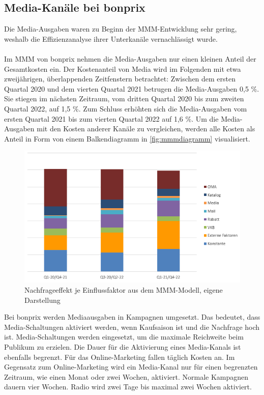 \subsection{Media-Kanäle bei bonprix} 
\label{MediaKanäleBeiBonprix}
Die Media-Ausgaben waren zu Beginn der \ac{MMM}-Entwicklung sehr gering, weshalb die Effizienzanalyse ihrer Unterkanäle vernachlässigt wurde. \\\\
Im \ac{MMM} von bonprix nehmen die Media-Ausgaben nur einen kleinen Anteil der Gesamtkosten ein. Der Kostenanteil von Media wird im Folgenden mit etwa zweijährigen, überlappenden Zeitfenstern betrachtet: Zwischen dem ersten Quartal 2020 und dem vierten Quartal 2021 betrugen die Media-Ausgaben 0,5 \%. Sie stiegen im nächsten Zeitraum, vom dritten Quartal 2020 bis zum zweiten Quartal 2022, auf 1,5 \%. Zum Schluss erhöhten sich die Media-Ausgaben vom ersten Quartal 2021 bis zum vierten Quartal 2022 auf 1,6 \%. Um die Media-Ausgaben mit den Kosten anderer Kanäle zu vergleichen, werden alle Kosten als Anteil in Form von einem Balkendiagramm in \autoref{fig:mmmdiagramm} visualisiert. 
\begin{figure}[H]
    \centering
    \includegraphics[width=0.75\linewidth]{images/mmmdiagramm.png}
    \caption{Nachfrageeffekt je Einflussfaktor aus dem \ac{MMM}-Modell, eigene Darstellung }
    \label{fig:mmmdiagramm}
\end{figure}
\noindent
Bei bonprix werden Mediaausgaben in Kampagnen umgesetzt. Das bedeutet, dass Media-Schaltungen aktiviert werden, wenn Kaufsaison ist und die Nachfrage hoch ist. Media-Schaltungen werden eingesetzt, um die maximale Reichweite beim Publikum zu erzielen. Die Dauer für die Aktivierung eines Media-Kanals ist ebenfalls begrenzt. Für das Online-Marketing fallen täglich Kosten an. Im Gegensatz zum Online-Marketing wird ein Media-Kanal nur für einen begrenzten Zeitraum, wie einen Monat oder zwei Wochen, aktiviert. Normale Kampagnen dauern vier Wochen. Radio wird zwei Tage bis maximal zwei Wochen aktiviert. \\\\
